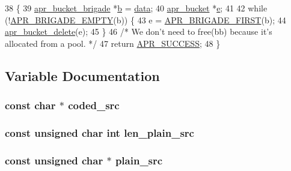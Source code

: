 \begin{DoxyCode}
38 \{
39     \hyperlink{structapr__bucket__brigade}{apr\_bucket\_brigade} *\hyperlink{group__APACHE__CORE__PROTO_ga7fa09c5c80a7d25b74511944f5949e31}{b} = \hyperlink{group__APACHE__CORE__LOG_gae4950db1dbfff8459a712737063b61aa}{data};
40     \hyperlink{structapr__bucket}{apr\_bucket} *\hyperlink{group__APR__Util__Bucket__Brigades_gacd90314acb2c2e5cd19681136c08efac}{e};
41 
42     \textcolor{keywordflow}{while} (!\hyperlink{group__APR__Util__Bucket__Brigades_ga836f61da6cce15074eff257ce4b6fc0f}{APR\_BRIGADE\_EMPTY}(b)) \{
43         e = \hyperlink{group__APR__Util__Bucket__Brigades_gab5826a11eb6ba90786a94282f806c230}{APR\_BRIGADE\_FIRST}(b);
44         \hyperlink{group__APR__Util__Bucket__Brigades_ga8925c02a7f95e8c1c3986294d4678797}{apr\_bucket\_delete}(e);
45     \}
46     \textcolor{comment}{/* We don't need to free(bb) because it's allocated from a pool. */}
47     \textcolor{keywordflow}{return} \hyperlink{group__apr__errno_ga9ee311b7bf1c691dc521d721339ee2a6}{APR\_SUCCESS};
48 \}
\end{DoxyCode}


\subsection{Variable Documentation}
\subsubsection[{\texorpdfstring{coded\+\_\+src}{coded_src}}]{\setlength{\rightskip}{0pt plus 5cm}const char $\ast$ coded\+\_\+src}\hypertarget{group__APR__Util__Base64_ga08926cbeac2cf20ecb41b19c6c5ee914}{}\label{group__APR__Util__Base64_ga08926cbeac2cf20ecb41b19c6c5ee914}
\subsubsection[{\texorpdfstring{len\+\_\+plain\+\_\+src}{len_plain_src}}]{\setlength{\rightskip}{0pt plus 5cm}const unsigned char {\bf int} len\+\_\+plain\+\_\+src}\hypertarget{group__APR__Util__Base64_ga23d56ef91e6602387e96a5ae6b3bd7d4}{}\label{group__APR__Util__Base64_ga23d56ef91e6602387e96a5ae6b3bd7d4}
\subsubsection[{\texorpdfstring{plain\+\_\+src}{plain_src}}]{\setlength{\rightskip}{0pt plus 5cm}const unsigned char $\ast$ plain\+\_\+src}\hypertarget{group__APR__Util__Base64_ga4cb0359205d009041bb10a3a24ad47a5}{}\label{group__APR__Util__Base64_ga4cb0359205d009041bb10a3a24ad47a5}
